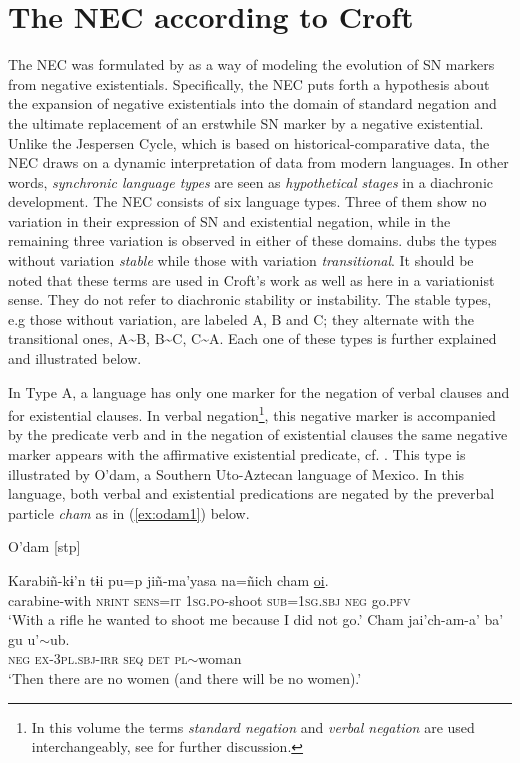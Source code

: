 \documentclass[output=paper,chinesefont,colorlinks,citecolor=brown]{langscibook}
\begin{document}
\section{The NEC according to Croft}\label{section:nec-intro}\label{sec:intro:2.6}
The NEC was formulated by \citet{Croft1991} as a way of modeling the evolution of SN markers from negative existentials. Specifically, the NEC puts forth a hypothesis about the expansion of negative existentials into the domain of standard negation and the ultimate replacement of an erstwhile SN marker by a negative existential. Unlike the Jespersen Cycle, which is based on historical-comparative data, the NEC draws on a dynamic interpretation of data from modern languages. In other words, \textit{synchronic language types }are seen as \textit{hypothetical stages} in a diachronic development. The NEC consists of six language types. Three of them show no variation in their expression of SN and existential negation, while in the remaining three variation is observed in either of these domains. \citet{Croft1991} dubs the types without variation \textit{stable} while those with variation \textit{transitional}. It should be noted that these terms are used in Croft’s work as well as here in a variationist sense. They do not refer to diachronic stability or instability. The stable types, e.g those without variation, are labeled A, B and C; they alternate with the transitional ones, A{\textasciitilde}B, B{\textasciitilde}C, C{\textasciitilde}A. Each one of these types is further explained and illustrated below.

In Type A, a language has only one marker for the negation of verbal clauses and for existential clauses. In verbal negation\footnote{In this volume the terms \textit{standard negation} and \textit{verbal negation} are used interchangeably, see  for further discussion.}, this negative marker is accompanied by the predicate verb and in the negation of existential clauses the same negative marker appears with the affirmative existential predicate, cf. \citep[6--7]{Croft1991}. This type is illustrated by O’dam, a Southern Uto-Aztecan language of Mexico. In this language, both verbal and existential predications are negated by the preverbal particle \textit{cham} as in (\ref{ex:odam1}) below.

\begin{exe}
\ex O’dam [stp]  \label{ex:odam1}
\begin{xlist}
\ex \label{ex:odam1a}
\gll Karabiñ-kɨ’n tɨi pu=p jiñ-ma’yasa na=ñich 		cham \uline{oi}.\\
carabine-with \textsc{nrint} \textsc{sens=it} \textsc{1sg.po}-shoot \textsc{sub=1sg.sbj} \textsc{neg} go.\textsc{pfv}\\
\glt ‘With a rifle he wanted to shoot me because I did not go.’
\ex \label{ex:odam1b}
\gll Cham jai’ch-am-a’ ba’ gu u’$\sim$ub.\\
\textsc{neg} \textsc{ex-3pl.sbj-irr} \textsc{seq}	\textsc{det} \textsc{pl}$\sim$woman\\
\glt ‘Then there are no women (and there will be no women).’
\end{xlist}
\end{exe}
\end{document}

